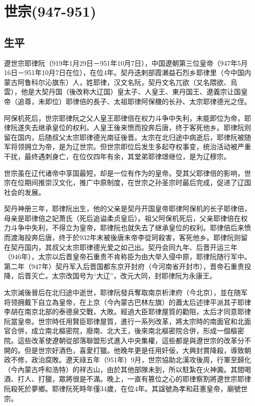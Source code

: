 
\section{世宗\tiny(947-951)}

\subsection{生平}

遼世宗耶律阮（919年1月29日－951年10月7日），中国遼朝第三位皇帝（947年5月16日－951年10月7日在位），在位4年。契丹迭剌部霞濑益石烈乡耶律里（今中国内蒙古阿鲁科尔沁旗东）人，姓耶律，汉文名阮，契丹文名兀欲（又名隈欲、烏雲），他是大契丹国（後改称大辽国）皇太子、人皇王、東丹国王、遼義宗让国皇帝（追尊，未即位）耶律倍的長子、太祖耶律阿保機的长孙、太宗耶律德光之侄。

阿保机死后，世宗耶律阮之父人皇王耶律倍在权力斗争中失利，未能即位为帝，耶律阮遂失去继承皇位的权利。人皇王後来愤而投奔后唐，终于客死他乡。耶律阮则留在国内，后随叔父太宗耶律德光南征後晋。太宗在北归途中病逝后，耶律阮被随军将领拥立为帝，是为辽世宗。但世宗即位后发生多起夺权事变，统治活动被严重干扰，最终遇刺身亡，在位仅四年有余，其堂弟耶律璟继位，是为辽穆宗。

世宗虽在辽代诸帝中享国最短，却是一位有作为的皇帝。受其父耶律倍的影响，世宗在位期间推崇汉文化，推广中原制度，在世宗之孙圣宗时最后完成，促进了辽国社会的发展。

契丹神册三年，耶律阮出生，他的父亲是契丹开国皇帝耶律阿保机的长子耶律倍，母亲是耶律倍之妃萧氏（死后追谥柔贞皇后）。祖父阿保机死后，父亲耶律倍在权力斗争中失利，不得立为皇帝，耶律阮也就失去了继承皇位的权利。耶律倍后来愤而渡海投奔后唐，终于於932年末被後唐末帝李從珂殺害，客死他乡。耶律阮则留在契丹国内，其叔父太宗耶律德光爱之如己出。契丹会同九年、后晋开运三年（946年），太宗以后晋皇帝石重贵不肯称臣为由大举入侵中原，耶律阮随行军中。第二年（947年）契丹军入后晋国都东京开封府（今河南省开封市），晋帝石重贵投降，后晋灭亡。太宗改国号为“大辽”，改元大同，封耶律阮为永康王。

太宗滅後晉后在北归途中逝世，耶律阮發兵奪取南京析津府（今北京），並在随军将领拥戴下自立為皇帝，在上京（今內蒙古巴林左旗）的蕭太后述律平派其子耶律李胡在南京北部的泰德泉交戰，大敗。經過大臣耶律屋質的勸阻，太后才同意耶律阮當皇帝。世宗時任用賢臣耶律屋質，進行一系列改革，將太宗時的南面官和北面官合併，成立南北樞密院，廢南、北大王，後來南北樞密院合併，形成一個樞密院。這些改革使遼朝從部落聯盟形式進入中央集權，這些都是與遼世宗的改革分不開的。但是世宗好酒色，喜愛打獵。他晚年更是任用奸佞，大興封賞降殺，導致朝政不修，政治腐敗。遼天祿五年（951年）9月，世宗協助北漢攻後周，行軍至歸化（今內蒙古呼和浩特）的祥古山，由於其他部隊未到，所以駐紮在火神澱。其間喝酒、打人、打獵，眾將很是不滿。晚上，一直有篡位之心的耶律察割將遼世宗耶律阮殺死於夢鄉。耶律阮死時年僅34歲，在位4年。其諡號為孝和莊憲皇帝，廟號世宗。

